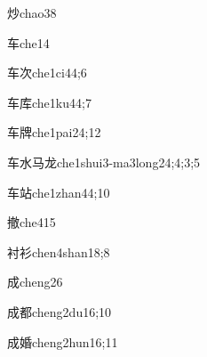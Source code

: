 \begin{verbete}{炒}{chao3}{8}
\end{verbete}

\begin{verbete}{车}{che1}{4}
\end{verbete}

\begin{verbete}{车次}{che1ci4}{4;6}
\end{verbete}

\begin{verbete}{车库}{che1ku4}{4;7}
\end{verbete}

\begin{verbete}{车牌}{che1pai2}{4;12}
\end{verbete}

\begin{verbete}{车水马龙}{che1shui3-ma3long2}{4;4;3;5}
\end{verbete}

\begin{verbete}{车站}{che1zhan4}{4;10}
\end{verbete}

\begin{verbete}{撤}{che4}{15}
\end{verbete}

\begin{verbete}{衬衫}{chen4shan1}{8;8}
\end{verbete}

\begin{verbete}{成}{cheng2}{6}
\end{verbete}

\begin{verbete}{成都}{cheng2du1}{6;10}
\end{verbete}

\begin{verbete}{成婚}{cheng2hun1}{6;11}
\end{verbete}

